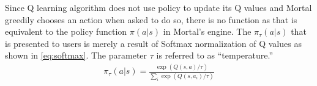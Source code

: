 \documentclass[10pt, twocolumn, notitlepage]{report}
\begin{document}
Since Q learning algorithm does not use policy to update its Q values and Mortal greedily chooses an action when asked to do so, there is no function as that is equivalent to the policy function $\pi(a|s)$ in Mortal's engine. The $\pi_\tau(a|s)$ that is presented to users is merely a result of Softmax normalization of Q values as shown in \eqref{eq:softmax}. The parameter $\tau$ is referred to as ``temperature.''
%
\begin{align}
  \pi_\tau(a|s) = \frac{\exp(Q(s, a) / \tau)}{\sum_i \exp(Q(s, a_i) / \tau)} \label{eq:softmax}
\end{align}
%
%
%
%
%
%
%
%
%
%




\nocite{*}


\end{document}
